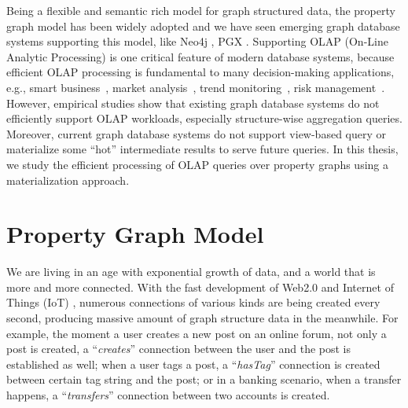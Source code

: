 

Being a flexible and semantic rich model for graph structured data, the property graph model has been widely adopted and we have seen emerging graph database systems supporting this model, like Neo4j \cite{DBLP:conf/oopsla/Webber12}, PGX \cite{DBLP:conf/sc/HongDMLVC15}. Supporting OLAP (On-Line Analytic Processing) is one critical feature of modern database systems, because efficient OLAP processing is fundamental to many decision-making applications, e.g., smart business~\cite{Petermann:2014:GDI:2733004.2733034}, market analysis~\cite{DBLP:journals/corr/LamSG16}, trend monitoring~\cite{DBLP:journals/tii/FangXZAPYL14}, risk management~\cite{DBLP:journals/tcyb/ChoiCY17}. However, empirical studies show that existing graph database systems do not efficiently support OLAP workloads, especially structure-wise aggregation queries. Moreover, current graph database systems do not support view-based query or materialize some ``hot'' intermediate results to serve future queries. In this thesis, we study the efficient processing of OLAP queries over property graphs  using a materialization approach.


\section{Property Graph Model}
\label{s:1}

We are living in an age with exponential growth of data, and a world that is more and more connected.  With the fast development of Web2.0 and Internet of Things (IoT) \cite{DBLP:journals/cacm/X17f}, numerous connections of various kinds are being created every second, producing massive amount of graph structure data in the meanwhile. For example, the moment a user creates a new post on an online forum, not only a post is created,  a ``\emph{creates}'' connection between the user and the post is established as well; when a user tags a post, a ``\emph{hasTag}'' connection is created between certain tag string and the post; or in a banking scenario, when a transfer happens, a ``\emph{transfers}'' connection between two accounts is created.

